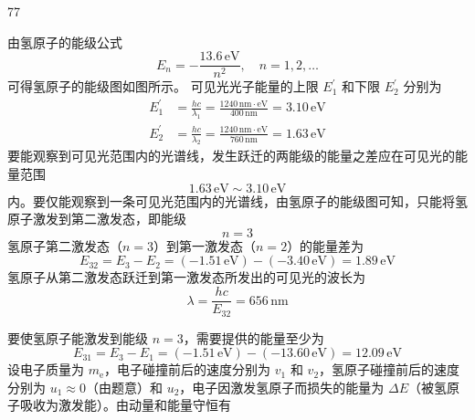\begin{solution}{77}
    \begin{subsolution}
        由氢原子的能级公式
        \begin{equation}
            E_{n} = - \frac{13.6\,\mathrm{eV}}{n^{2}},\quad n = 1, 2, \dots
            \label{eq:1.s77}
        \end{equation}
        可得氢原子的能级图如图所示。
        可见光光子能量的上限 $E_{1}^{\prime}$ 和下限 $E_{2}^{\prime}$ 分别为
        \begin{align}
            E_{1}^{\prime} &= \frac{h c}{\lambda_{1}} = \frac{1240\,\mathrm{nm \cdot eV}}{400\,\mathrm{nm}} = 3.10\,\mathrm{eV} \label{eq:2.s77} \\
            E_{2}^{\prime} &= \frac{h c}{\lambda_{2}} = \frac{1240\,\mathrm{nm \cdot eV}}{760\,\mathrm{nm}} = 1.63\,\mathrm{eV} \label{eq:3.s77}
        \end{align}
        要能观察到可见光范围内的光谱线，发生跃迁的两能级的能量之差应在可见光的能量范围
        \begin{equation}
            1.63\,\mathrm{eV} \sim 3.10\,\mathrm{eV}
            \label{eq:4.s77}
        \end{equation}
        内。要仅能观察到一条可见光范围内的光谱线，由氢原子的能级图可知，只能将氢原子激发到第二激发态，即能级
        \begin{equation}
            n = 3
            \label{eq:5.s77}
        \end{equation}
        氢原子第二激发态（$n=3$）到第一激发态（$n=2$）的能量差为
        \begin{equation}
            E_{32} = E_{3} - E_{2} = (-1.51\,\mathrm{eV}) - (-3.40\,\mathrm{eV}) = 1.89\,\mathrm{eV}
            \label{eq:6.s77}
        \end{equation}
        氢原子从第二激发态跃迁到第一激发态所发出的可见光的波长为
        \begin{equation}
            \lambda = \frac{h c}{E_{32}} = 656\,\mathrm{nm}
            \label{eq:7.s77}
        \end{equation}
    \end{subsolution}
    \begin{subsolution}
        要使氢原子能激发到能级 $n=3$，需要提供的能量至少为
        \begin{equation}
            E_{31} = E_{3} - E_{1} = (-1.51\,\mathrm{eV}) - (-13.60\,\mathrm{eV}) = 12.09\,\mathrm{eV}
            \label{eq:8.s77}
        \end{equation}
        设电子质量为 $m_{\mathrm{e}}$，电子碰撞前后的速度分别为 $v_{1}$ 和 $v_{2}$，氢原子碰撞前后的速度分别为 $u_{1} \approx 0$（由题意）和 $u_{2}$，电子因激发氢原子而损失的能量为 $\Delta E$（被氢原子吸收为激发能）。由动量和能量守恒有

\end{subsolution}
\end{solution}
